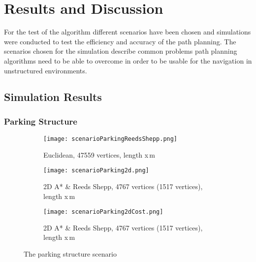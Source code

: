 \chapter{Results and Discussion}
For the test of the algorithm different scenarios have been chosen and simulations were conducted to test the efficiency and accuracy of the path planning. The scenarios chosen for the simulation describe common problems path planning algorithms need to be able to overcome in order to be usable for the navigation in unstructured environments.


%
%

\section{Simulation Results}

\subsection{Parking Structure}

\begin{figure}[h]
    \centering
    \begin{subfigure}[t]{\textwidth}
    \texttt{[image: scenarioParkingReedsShepp.png]}
        \caption{Euclidean, 47559 vertices, length x\,m}
    \label{fig:scenarioParkingNo2d}
    \end{subfigure}
    \begin{subfigure}[t]{\textwidth}
    \texttt{[image: scenarioParking2d.png]}
        \caption{2D A* \& Reeds Shepp, 4767 vertices (1517 vertices), length x\,m}
    \label{fig:scenarioParking2D}
    \end{subfigure}    
    \begin{subfigure}[t]{\textwidth}
    \texttt{[image: scenarioParking2dCost.png]}
        \caption{2D A* \& Reeds Shepp, 4767 vertices (1517 vertices), length x\,m}
    \label{fig:scenarioParking2dCost}
    \end{subfigure}
    \caption{The parking structure scenario}
    \label{fig:scenarioParking}
\end{figure}

